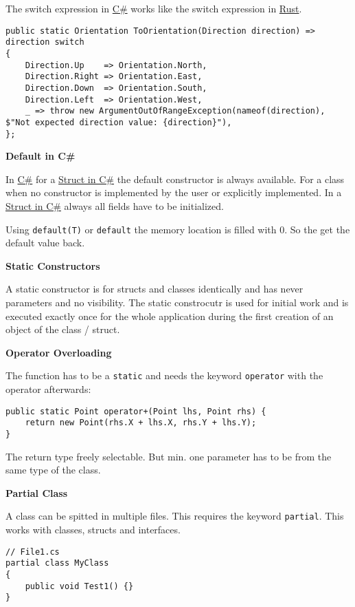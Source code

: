 \documentclass[11pt,twoside,landscape]{article}
\begin{document}
\begin{multicols}{3}
The switch expression in \href{../../../roam/20211003114158-c.org}{C\#} works like the switch expression in \href{../../../roam/20200904153952-rust.org}{Rust}.

\lstset{language=csharp,label= ,caption= ,captionpos=b,numbers=none}
\begin{lstlisting}
public static Orientation ToOrientation(Direction direction) => direction switch
{
    Direction.Up    => Orientation.North,
    Direction.Right => Orientation.East,
    Direction.Down  => Orientation.South,
    Direction.Left  => Orientation.West,
    _ => throw new ArgumentOutOfRangeException(nameof(direction), $"Not expected direction value: {direction}"),
};
\end{lstlisting}

\textbf{Default in C\#}

In \href{../../../roam/20211003114158-c.org}{C\#} for a \href{../../../roam/20211008085202-struct_in_c.org}{Struct in C\#} the default constructor is always available.
For a class when no constructor is implemented by the user or explicitly implemented.
In a \href{../../../roam/20211008085202-struct_in_c.org}{Struct in C\#} always all fields have to be initialized.

Using \texttt{default(T)} or \texttt{default} the memory location is filled with 0.
So the get the default value back.

\textbf{Static Constructors}

A static constructor is for structs and classes identically and has never parameters and no visibility.
The static constrocutr is used for initial work and is executed exactly once for the whole application during the first creation of an object of the class / struct.

\textbf{Operator Overloading}

The function has to be a \texttt{static} and needs the keyword \texttt{operator} with the operator afterwards:
\lstset{language=csharp,label= ,caption= ,captionpos=b,numbers=none}
\begin{lstlisting}
public static Point operator+(Point lhs, Point rhs) {
    return new Point(rhs.X + lhs.X, rhs.Y + lhs.Y);
}
\end{lstlisting}

The return type freely selectable.
But min. one parameter has to be from the same type of the class.

\textbf{Partial Class}

A class can be spitted in multiple files.
This requires the keyword \texttt{partial}.
This works with classes, structs and interfaces.
\lstset{language=csharp,label= ,caption= ,captionpos=b,numbers=none}
\begin{lstlisting}
// File1.cs
partial class MyClass
{
    public void Test1() {}
}


\end{lstlisting}
\end{multicols}
\end{document}
